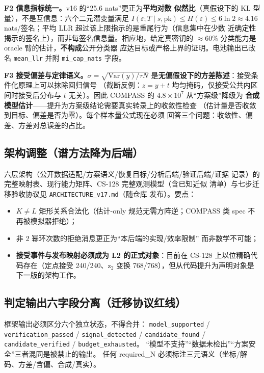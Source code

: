 \documentclass[11pt,a4paper]{ctexart}
\begin{document}
\textbf{F2 信息指标统一。}v16 的``25.6 nats''更正为\textbf{平均对数
似然比}（真假设下的 KL 型量），不是互信息：六个二元潜变量满足
$I(\varepsilon;T\mid s,\mathrm{pk})\le H(\varepsilon)\le 6\ln2\approx4.16$
nats/签名；平均 LLR 超过该上限指示的是重尾行为（信息集中在少数
近确定性揭示的签名上），而非每签名信息量。相应地，给定真密钥的
$\approx$60\% 分类能力是 oracle 臂的估计，\textbf{不构成}公开分类器
应达目标或严格上界的证明。电池输出已改名 \texttt{mean\_llr} 并附
\texttt{mi\_cap\_nats} 字段。

\textbf{F3 接受偏差与定律语义。}$\sigma=\sqrt{\mathrm{Var}(y)/\tau N}$
是\textbf{无偏假设下的方差陈述}：接受条件化原理上可以抹除回归信号
（截断反例：$z=y+t$ 均匀掩码，仅接受公共内区间时接受后分布与 $t$
无关）。因此 COMPASS 的 $4.8\times10^7$ 从``方案级''降级为
\textbf{合成模型估计}——提升为方案级结论需要真实转录上的收敛性检查
（估计量是否收敛到目标、偏差是否为零）。每个样本量公式现在必须
回答三个问题：收敛性、偏差、方差对总误差的占比。

\subsection{架构调整（谱方法降为后端）}

六层架构（公开数据适配/方案语义/恢复目标/分析后端/验证后端/证据
记录）的完整映射表、现行能力矩阵、CS-128 完整观测模型（含已知近似
清单）与七步迁移验收协议见 \texttt{ARCHITECTURE\_v17.md}（随仓库
发布）。要点：

\begin{itemize}
  \item $K\ne L$ 矩形关系合法化（估计-only 规范无需方阵逆；COMPASS
        类 spec 不再被模拟器拒绝）；
  \item 非 2 幂环次数的拒绝消息更正为``本后端的实现/效率限制''
        而非数学不可能；
  \item \textbf{接受事件与发布映射必须成为 L2 的正式对象}：目前在
        CS-128 上以位精确代码存在（定点接受 240/240、z$_2$ 变换
        768/768），但从代码提升为声明对象是下一版的架构工作。
\end{itemize}

\subsection{判定输出六字段分离（迁移协议红线）}

框架输出必须区分六个独立状态，不得合并：
\texttt{model\_supported} / \texttt{verification\_passed} /
\texttt{signal\_detected} / \texttt{candidate\_found} /
\texttt{candidate\_verified} / \texttt{budget\_exhausted}。
``模型不支持''``数据未检出''``方案安全''三者混同是被禁止的输出。
任何 required\_N 必须标注三元语义（坐标/解码、方差/含偏、合成/真实）。
\end{document}
